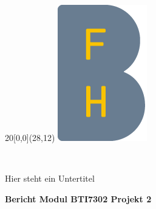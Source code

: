 %
%

\begin{titlepage}


\setlength{\unitlength}{1mm}
\begin{textblock}{20}[0,0](28,12)
	\includegraphics[scale=1.0]{bilder/BFH_Logo_B.png}
\end{textblock}
\color{black}

\begin{flushleft}

\vspace*{21mm}

\fontsize{26pt}{40pt}\selectfont 
\titel 				\\							%
\vspace{2mm}

\fontsize{16pt}{24pt}\selectfont\vspace{0.3em}
Hier steht ein Untertitel 			\\							%
\vspace{5mm}

\fontsize{10pt}{12pt}\selectfont
\textbf{Bericht Modul BTI7302 Projekt 2} \\									%
\vspace{7mm}



\end{flushleft}
\end{titlepage}
